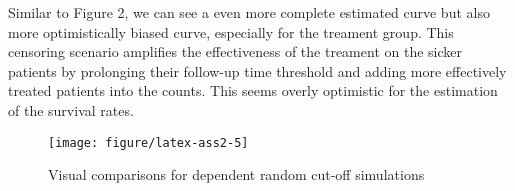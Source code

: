 \documentclass{article}\usepackage{graphicx, color}
\makeatletter
\def\maxwidth{ %
  \ifdim\Gin@nat@width>\linewidth
    \linewidth
  \else
    \Gin@nat@width
  \fi
}
\newenvironment{knitrout}{}{} %
\makeatother
\begin{document}
Similar to Figure 2, we can see a even more complete estimated curve
but also more optimistically biased curve, especially for the treament
group. This censoring scenario amplifies the effectiveness of the
treament on the sicker patients by prolonging their follow-up time
threshold and adding more effectively treated patients into the
counts. This seems overly optimistic for the estimation of the
survival rates.

\begin{knitrout}
\color{fgcolor}\begin{figure}[]


{\centering \texttt{[image: figure/latex-ass2-5]} 

}

\caption[Visual comparisons for dependent random cut-off simulations]{Visual comparisons for dependent random cut-off simulations\label{fig:ass2-5}}
\end{figure}


\end{knitrout}
\end{document}
